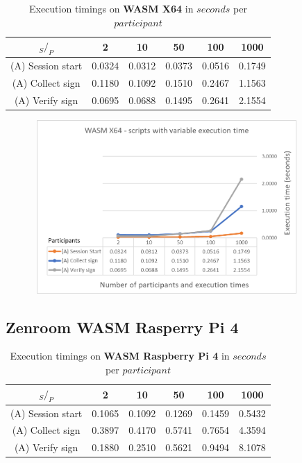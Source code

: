 \documentclass[twocolumn]{article}
\begin{document}
\begin{table}[h!]
  \begin{center}
    \caption{Execution timings on \textbf{WASM X64} in $seconds$ per $participant$}
      \label{tab:table1}
        \begin{tabular} {c|c|c|c|c|c}
          \toprule
           \textbf{$_S / _P$} & \textbf{2} & \textbf{10} & \textbf{50} & \textbf{100} & \textbf{1000} \\
          \midrule
          (A) Session start & 0.0324 & 0.0312 & 0.0373 & 0.0516 & 0.1749 \\
          (A) Collect sign & 0.1180 & 0.1092 & 0.1510 & 0.2467 & 1.1563 \\
          (A) Verify sign & 0.0695 & 0.0688 & 0.1495 & 0.2641 & 2.1554 \\
      \bottomrule %
    \end{tabular}
  \end{center}
\end{table}

\begin{figure}[h!]
    \centering
    \includegraphics[width=4in, height=2.6in]{graphs/WasmX64.png}
    \label{fig:galaxy}
\end{figure}

\newpage

\subsection*{Zenroom WASM Rasperry Pi 4}

\begin{table}[h!]
  \begin{center}
    \caption{Execution timings on \textbf{WASM Raspberry Pi 4} in $seconds$ per $participant$}
      \label{tab:table1}
        \begin{tabular} {c|c|c|c|c|c}
          \toprule
           \textbf{$_S / _P$} & \textbf{2} & \textbf{10} & \textbf{50} & \textbf{100} & \textbf{1000} \\
          \midrule
          (A) Session start & 0.1065 & 0.1092 & 0.1269 & 0.1459 & 0.5432 \\
          (A) Collect sign & 0.3897 & 0.4170 & 0.5741 & 0.7654 & 4.3594 \\
          (A) Verify sign & 0.1880 & 0.2510 & 0.5621 & 0.9494 & 8.1078 \\
      \bottomrule %
    \end{tabular}
  \end{center}
\end{table}
\end{document}
